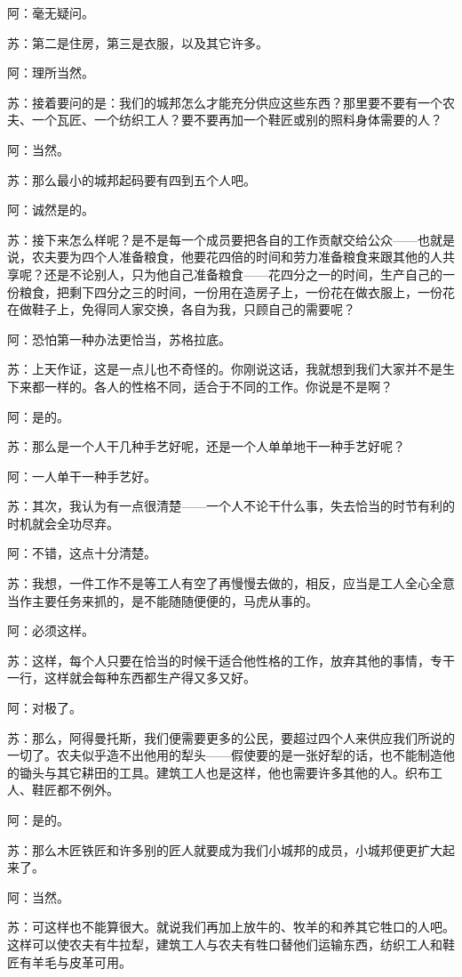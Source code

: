 \documentclass[11pt,oneside]{book}
\begin{document}
\begin{common-format}
阿：毫无疑问。

苏：第二是住房，第三是衣服，以及其它许多。

阿：理所当然。

苏：接着要问的是：我们的城邦怎么才能充分供应这些东西？那里要不要有一个农夫、一个瓦匠、一个纺织工人？要不要再加一个鞋匠或别的照料身体需要的人？

阿：当然。

苏：那么最小的城邦起码要有四到五个人吧。

阿：诚然是的。

苏：接下来怎么样呢？是不是每一个成员要把各自的工作贡献交给公众——也就是说，农夫要为四个人准备粮食，他要花四倍的时间和劳力准备粮食来跟其他的人共享呢？还是不论别人，只为他自己准备粮食——花四分之一的时间，生产自己的一份粮食，把剩下四分之三的时间，一份用在造房子上，一份花在做衣服上，一份花在做鞋子上，免得同人家交换，各自为我，只顾自己的需要呢？

阿：恐怕第一种办法更恰当，苏格拉底。

苏：上天作证，这是一点儿也不奇怪的。你刚说这话，我就想到我们大家并不是生下来都一样的。各人的性格不同，适合于不同的工作。你说是不是啊？

阿：是的。

苏：那么是一个人干几种手艺好呢，还是一个人单单地干一种手艺好呢？

阿：一人单干一种手艺好。

苏：其次，我认为有一点很清楚——一个人不论干什么事，失去恰当的时节有利的时机就会全功尽弃。

阿：不错，这点十分清楚。

苏：我想，一件工作不是等工人有空了再慢慢去做的，相反，应当是工人全心全意当作主要任务来抓的，是不能随随便便的，马虎从事的。

阿：必须这样。

苏：这样，每个人只要在恰当的时候干适合他性格的工作，放弃其他的事情，专干一行，这样就会每种东西都生产得又多又好。

阿：对极了。

苏：那么，阿得曼托斯，我们便需要更多的公民，要超过四个人来供应我们所说的一切了。农夫似乎造不出他用的犁头——假使要的是一张好犁的话，也不能制造他的锄头与其它耕田的工具。建筑工人也是这样，他也需要许多其他的人。织布工人、鞋匠都不例外。

阿：是的。

苏：那么木匠铁匠和许多别的匠人就要成为我们小城邦的成员，小城邦便更扩大起来了。

阿：当然。

苏：可这样也不能算很大。就说我们再加上放牛的、牧羊的和养其它牲口的人吧。这样可以使农夫有牛拉犁，建筑工人与农夫有牲口替他们运输东西，纺织工人和鞋匠有羊毛与皮革可用。


\end{common-format}
\end{document}
